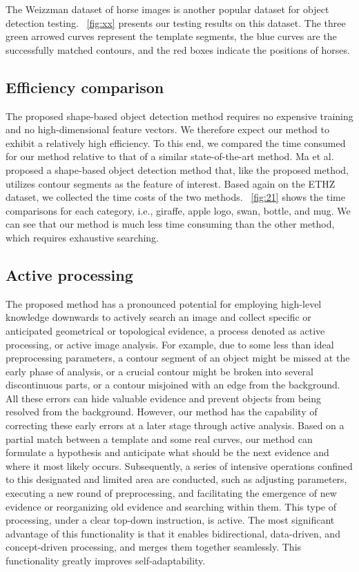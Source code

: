 \documentclass[journal]{IEEEtran}
\begin{document}
The Weizzman dataset of horse images is another popular dataset for object detection testing. 
\figurename~\ref{fig:xx} presents our testing results on this dataset. 
The three green arrowed curves represent the template segments, 
the blue curves are the successfully matched contours, and the red boxes indicate the positions of horses.

\subsection{Efficiency comparison}

The proposed shape-based object detection method requires no expensive training and no high-dimensional feature vectors. We therefore expect our method to exhibit a relatively high efficiency. 
To this end, we compared the time consumed for our method relative to that of a similar state-of-the-art method. 
Ma et al. \cite{ma2011} proposed a shape-based object detection method that, 
like the proposed method, utilizes contour segments as the feature of interest. 
Based again on the ETHZ dataset, we collected the time costs of the two methods.
\figurename~\ref{fig:21} shows the time comparisons for each category, 
i.e., giraffe, apple logo, swan, bottle, and mug. 
We can see that our method is much less time consuming than the other method, 
which requires exhaustive searching.

\subsection{Active processing}

The proposed method has a pronounced potential for employing high-level knowledge downwards to actively search an image and collect specific or anticipated geometrical or topological evidence, 
a process denoted as active processing, or active image analysis. 
For example, due to some less than ideal preprocessing parameters, 
a contour segment of an object might be missed at the early phase of analysis, 
or a crucial contour might be broken into several discontinuous parts, 
or a contour misjoined with an edge from the background. 
All these errors can hide valuable evidence and prevent objects from being resolved from the background. 
However, our method has the capability of correcting these early errors at a later stage through active analysis. 
Based on a partial match between a template and some real curves, 
our method can formulate a hypothesis and anticipate what should be the next evidence and where it most likely occurs. 
Subsequently, a series of intensive operations confined to this designated and limited area are conducted, 
such as adjusting parameters, executing a new round of preprocessing, 
and facilitating the emergence of new evidence or reorganizing old evidence and searching within them. 
This type of processing, under a clear top-down instruction, is active. 
The most significant advantage of this functionality is that it enables bidirectional, data-driven, 
and concept-driven processing, and merges them together seamlessly. 
This functionality greatly improves self-adaptability.
  
\end{document}
